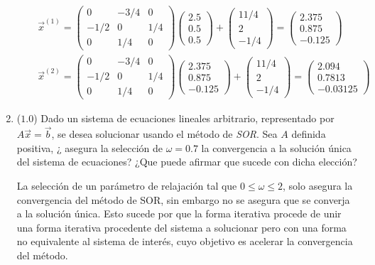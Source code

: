 \documentclass[12pt]{article}
\begin{document}
\begin{enumerate}[leftmargin=*,widest=9]
\begin{enumerate}[label=\alph*]
   \begin{eqnarray*}
   \vec{x}^{(1)} = \begin{pmatrix}
    0 & -3/4 & 0 \\ -1/2 & 0 & 1/4\\ 0 & 1/4 & 0
    \end{pmatrix} \begin{pmatrix}
    2.5 \\ 0.5\\ 0.5
    \end{pmatrix} + \begin{pmatrix}
    11/4 \\ 2\\ -1/4
    \end{pmatrix} = \begin{pmatrix}
    2.375 \\ 0.875\\ -0.125
    \end{pmatrix} \\
    \vec{x}^{(2)} = \begin{pmatrix}
    0 & -3/4 & 0 \\ -1/2 & 0 & 1/4\\ 0 & 1/4 & 0
    \end{pmatrix} \begin{pmatrix}
    2.375 \\ 0.875\\ -0.125
    \end{pmatrix} + \begin{pmatrix}
    11/4 \\ 2\\ -1/4
    \end{pmatrix} = \begin{pmatrix}
    2.094 \\ 0.7813\\ -0.03125
    \end{pmatrix}
   \end{eqnarray*}
   
    \end{enumerate}
    
  \item (\(1.0\)) Dado un sistema de ecuaciones lineales arbitrario, representado por \(A\vec{x} = \vec{b}\), se desea solucionar usando el método de \textit{SOR}. Sea \(A\) definida positiva, ¿ asegura la selección de \(\omega = 0.7\) la convergencia a la solución única del sistema de ecuaciones? ¿Que puede afirmar que sucede con dicha elección?
  
  La selección de un parámetro de relajación tal que \(0 \leq \omega \leq 2\), solo asegura la convergencia del método de SOR, sin embargo no se asegura que se converja a la solución única. Esto sucede por que la forma iterativa procede de unir una forma iterativa procedente del sistema a solucionar pero con una forma no equivalente al sistema de interés, cuyo objetivo es acelerar la convergencia del método. 
    
  \end{enumerate}
\end{document}
